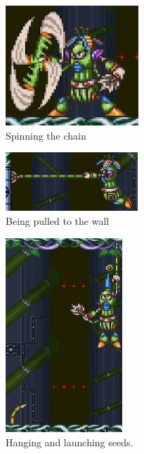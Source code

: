 \begin{figure}[htp]
	\centering	
	\begin{minipage}{0.4\linewidth}		
		\begin{subfigure}{\linewidth}
			\centering
			\includegraphics[height=4.5cm]{figures/X2/Wire_sponge/Sponge_spin.png}
			\caption{Spinning the chain}
		\end{subfigure}
		\begin{subfigure}{\linewidth}
			\centering
			\includegraphics[height=2.2cm]{figures/X2/Wire_sponge/Sponge_pull.jpg}
			\caption{Being pulled to the wall}
		\end{subfigure}
	\end{minipage}
	\begin{minipage}{0.4\linewidth}		
		\begin{subfigure}{\linewidth}
			\centering
			\includegraphics[height=7.3cm]{figures/X2/Wire_sponge/Sponge_hang.jpg}
			\caption{Hanging and launching seeds.}
		\end{subfigure}
	\end{minipage}
	\begin{subfigure}{\linewidth}

\end{subfigure}
\end{figure}
